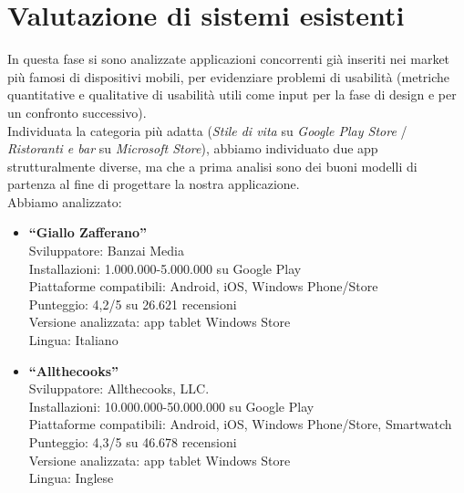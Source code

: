 \section{Valutazione di sistemi esistenti}

In questa fase si sono analizzate applicazioni concorrenti già inseriti nei market più famosi di dispositivi mobili, per evidenziare problemi di usabilità (metriche quantitative e qualitative di usabilità utili come input per la fase di design e per un confronto successivo).\\
Individuata la categoria più adatta (\textit{Stile di vita} su \textit{Google Play Store} / \textit{Ristoranti e bar} su \textit{Microsoft Store}), abbiamo individuato due app strutturalmente
diverse, ma che a prima analisi sono dei buoni modelli di partenza al fine di progettare la nostra applicazione.\\
Abbiamo analizzato:
\begin{itemize}
\item \textbf{``Giallo Zafferano''}\\
Sviluppatore: Banzai Media\\
Installazioni: 1.000.000-5.000.000 su Google Play\\
Piattaforme compatibili: Android, iOS, Windows Phone/Store\\
Punteggio: 4,2/5 su 26.621 recensioni\\
Versione analizzata: app tablet Windows Store\\
Lingua: Italiano\\
\item \textbf{``Allthecooks''}\\
Sviluppatore: Allthecooks, LLC.\\
Installazioni: 10.000.000-50.000.000 su Google Play\\
Piattaforme compatibili: Android, iOS, Windows Phone/Store, Smartwatch\\
Punteggio: 4,3/5 su 46.678 recensioni\\
Versione analizzata: app tablet Windows Store\\
Lingua: Inglese\\
\end{itemize} 

